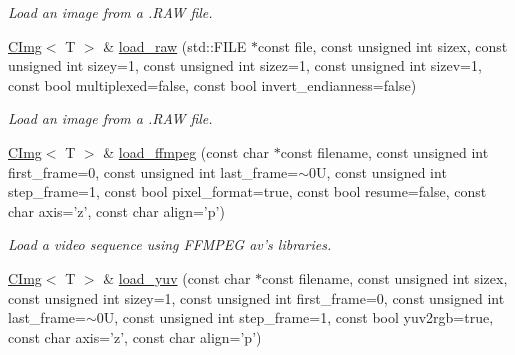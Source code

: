 \begin{DoxyCompactItemize}
\begin{DoxyCompactList}\small\item\em Load an image from a .RAW file. \item\end{DoxyCompactList}\item 
\hypertarget{structcimg__library_1_1CImg_ad9c207f9a35abe46df1d60ec708c107a}{
\hyperlink{structcimg__library_1_1CImg}{CImg}$<$ T $>$ \& \hyperlink{structcimg__library_1_1CImg_ad9c207f9a35abe46df1d60ec708c107a}{load\_\-raw} (std::FILE $\ast$const file, const unsigned int sizex, const unsigned int sizey=1, const unsigned int sizez=1, const unsigned int sizev=1, const bool multiplexed=false, const bool invert\_\-endianness=false)}
\label{structcimg__library_1_1CImg_ad9c207f9a35abe46df1d60ec708c107a}

\begin{DoxyCompactList}\small\item\em Load an image from a .RAW file. \item\end{DoxyCompactList}\item 
\hypertarget{structcimg__library_1_1CImg_a0ea50f5bd07d9d8ae9ab11aaf6a87a31}{
\hyperlink{structcimg__library_1_1CImg}{CImg}$<$ T $>$ \& \hyperlink{structcimg__library_1_1CImg_a0ea50f5bd07d9d8ae9ab11aaf6a87a31}{load\_\-ffmpeg} (const char $\ast$const filename, const unsigned int first\_\-frame=0, const unsigned int last\_\-frame=$\sim$0U, const unsigned int step\_\-frame=1, const bool pixel\_\-format=true, const bool resume=false, const char axis='z', const char align='p')}
\label{structcimg__library_1_1CImg_a0ea50f5bd07d9d8ae9ab11aaf6a87a31}

\begin{DoxyCompactList}\small\item\em Load a video sequence using FFMPEG av's libraries. \item\end{DoxyCompactList}\item 
\hypertarget{structcimg__library_1_1CImg_a64327752de9e98850b67701948960903}{
\hyperlink{structcimg__library_1_1CImg}{CImg}$<$ T $>$ \& \hyperlink{structcimg__library_1_1CImg_a64327752de9e98850b67701948960903}{load\_\-yuv} (const char $\ast$const filename, const unsigned int sizex, const unsigned int sizey=1, const unsigned int first\_\-frame=0, const unsigned int last\_\-frame=$\sim$0U, const unsigned int step\_\-frame=1, const bool yuv2rgb=true, const char axis='z', const char align='p')}
\label{structcimg__library_1_1CImg_a64327752de9e98850b67701948960903}


\end{DoxyCompactItemize}
